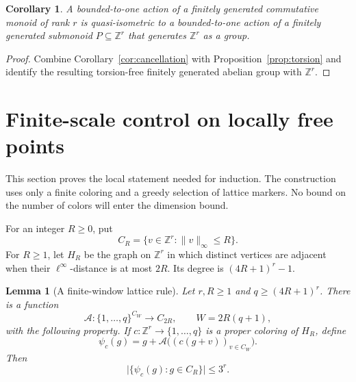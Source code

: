 \documentclass[11pt,letterpaper]{article}
\newtheorem{lemma}[theorem]{Lemma}
\newtheorem{corollary}[theorem]{Corollary}
\theoremstyle{definition}
\newcommand{\ZZ}{\mathbb Z}
\newcommand{\norm}[1]{\lVert #1\rVert_\infty}
\begin{document}
\begin{corollary}\label{cor:lattice-reduction}
A bounded-to-one action of a finitely generated commutative monoid of
rank $r$ is quasi-isometric to a bounded-to-one action of a finitely
generated submonoid $P\subseteq\ZZ^r$ that generates $\ZZ^r$ as a group.
\end{corollary}

\begin{proof}
Combine Corollary~\ref{cor:cancellation} with
Proposition~\ref{prop:torsion} and identify the resulting torsion-free
finitely generated abelian group with $\ZZ^r$.
\end{proof}

\section{Finite-scale control on locally free points}\label{sec:local}

This section proves the local statement needed for induction. The
construction uses only a finite coloring and a greedy selection of lattice
markers. No bound on the number of colors will enter the dimension bound.

For an integer $R\ge0$, put
\[
 C_R=\{v\in\ZZ^r:\norm v\le R\}.
\]
For $R\ge1$, let $H_R$ be the graph on $\ZZ^r$ in which distinct vertices
are adjacent when their $\ell^\infty$-distance is at most $2R$. Its degree
is $(4R+1)^r-1$.

\begin{lemma}[A finite-window lattice rule]\label{lem:lattice-rule}
Let $r,R\ge1$ and $q\ge(4R+1)^r$. There is a function
\[
 \mathcal A:\{1,\ldots,q\}^{C_W}\longrightarrow C_{2R},
 \qquad W=2R(q+1),
\]
with the following property. If $c:\ZZ^r\to\{1,\ldots,q\}$ is a proper
coloring of $H_R$, define
\[
 \psi_c(g)=g+\mathcal A\bigl((c(g+v))_{v\in C_W}\bigr).
\]
Then
\begin{equation}\label{eq:lattice-count}
 \bigl|\{\psi_c(g):g\in C_R\}\bigr|\le3^r.
\end{equation}
\end{lemma}
\end{document}
